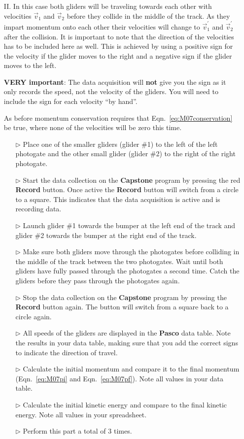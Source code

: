 \begin{itemize}
\item[II.] In this case both gliders will be traveling towards each other with velocities $\vec{v}_1$ and $\vec{v}_2$ before they collide in the middle of the track. As they impart momentum onto each other their velocities will change to $\vec{v}_1^\prime$ and $\vec{v}_2^\prime$ after the collision. It is important to note that the direction of the velocities has to be included here as well. This is achieved by using a positive sign for the velocity if the glider moves to the right and a negative sign if the glider moves to the left.
  
  \textbf{VERY important}: The data acquisition will \textbf{not} give you the sign as it only records the speed, not the velocity of the gliders. You will need to include the sign for each velocity ``by hand''.
  
  As before momentum conservation requires that Eqn.~\ref{eq:M07conservation} be true, where none of the velocities will be zero this time.

  \begin{itemize}
  \item[$\triangleright$] Place one of the smaller gliders (glider \#1) to the left of the left photogate and the other small glider (glider \#2) to the right of the right photogate.
  \item[$\triangleright$] Start the data collection on the \textbf{Capstone} program by pressing the red \textbf{Record} button. Once active the \textbf{Record} button will switch from a circle to a square. This indicates that the data acquisition is active and is recording data.
  \item[$\triangleright$] Launch glider \#1 towards the bumper at the left end of the track and glider \#2 towards the bumper at the right end of the track.
  \item[$\triangleright$] Make sure both gliders move through the photogates before colliding in the middle of the track between the two photogates. Wait until both gliders have fully passed through the photogates a second time. Catch the gliders before they pass through the photogates again.
  \item[$\triangleright$] Stop the data collection on the \textbf{Capstone} program by pressing the \textbf{Record} button again. The button will switch from a square back to a circle again.
  \item[$\triangleright$] All speeds of the gliders are displayed in the \textbf{Pasco} data table. Note the results in your data table, making sure that you add the correct signs to indicate the direction of travel.
  \item[$\triangleright$] Calculate the initial momentum and compare it to the final momentum (Eqn.~\ref{eq:M07pi} and Eqn.~\ref{eq:M07pf}). Note all values in your data table.
  \item[$\triangleright$] Calculate the initial kinetic energy and compare to the final kinetic energy. Note all values in your spreadsheet.
  \item[$\triangleright$] Perform this part a total of 3 times.
  \end{itemize}
\end{itemize}

